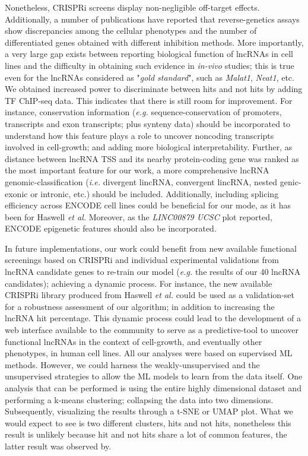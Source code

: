 Nonetheless, CRISPRi  screens display non-negligible off-target effects. Additionally, a number of publications have reported that reverse-genetics assays show discrepancies among the cellular phenotypes and the number of differentiated genes obtained with different inhibition methods.\autocite{stojic_2018_specificity} More importantly, a very large gap exists between reporting biological function of lncRNAs in cell lines and the difficulty in obtaining such evidence in \textit{in-vivo} studies; this is true even for the lncRNAs considered as "\textit{gold standard}", such as \textit{Malat1}, \textit{Neat1}, etc.\autocite{gao_2020_reverse_genetics}  We obtained increased power to discriminate between hits and not hits by adding TF ChIP-seq data. This indicates that there is still room for improvement. For instance, conservation information (\textit{e.g.} sequence-conservation of promoters, transcripts and exon transcripts; plus synteny data) should be incorporated to understand how this feature plays a role to uncover noncoding transcripts involved in cell-growth; and adding more biological interpretability. Further, as distance between lncRNA TSS and its nearby protein-coding gene was ranked as the most important feature for our work, a more comprehensive lncRNA genomic-classification (\textit{i.e.} divergent lincRNA, convergent lincRNA, nested genic-exonic or intronic, etc.) should be included. Additionally, including splicing efficiency across ENCODE cell lines could be beneficial for our mode, as it has been for Haswell \textit{et al.}\autocite{Haswell_2021_crispri} Moreover, as the \textit{LINC00879 UCSC} plot reported, ENCODE epigenetic features should also be incorporated.  

In future implementations, our work could benefit from new available functional screenings based on CRISPRi and individual experimental validations from lncRNA candidate genes to re-train our model (\textit{e.g.} the results of our 40 lncRNA candidates); achieving a dynamic process. For instance, the new available CRISPRi library produced from Haswell \textit{et al.}\autocite{Haswell_2021_crispri} could be used as a validation-set for a robustness assessment of our algorithm; in addition to increasing the lncRNA hit percentage. This dynamic process could lead to the development of a web interface available to the community to serve as a predictive-tool to uncover functional lncRNAs in the context of cell-growth, and eventually other phenotypes, in human cell lines. All our analyses were based on supervised ML methods. However, we could harness the  weakly-unsupervised and the unsupervised strategies to allow the ML models to learn from the data itself. One analysis that can be performed is using the entire highly dimensional dataset and performing a k-means clustering; collapsing the data into two dimensions. Subsequently, visualizing the results through a t-SNE or UMAP plot. What we would expect to see is two different clusters, hits and not hits, nonetheless this result is unlikely because hit and not hits share a lot of common features, the latter result was observed by.\autocite{Haswell_2021_crispri}

